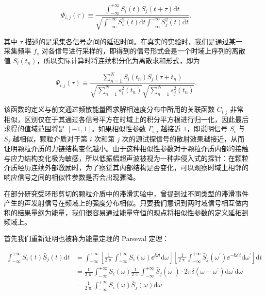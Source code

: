 \begin{equation}
  \Psi_{i,j}(\tau) \equiv \frac{\int_{-\infty}^{+\infty}S_{i}(t)S_{j}(t+\tau)\mathrm{d}t}{\sqrt{\int_{-\infty}^{+\infty}S_{i}^{2}(t)\mathrm{d}t\int_{-\infty}^{+\infty}S_{j}^{2}(t)\mathrm{d}t}}.
\end{equation}

其中 $\tau$ 描述的是采集各信号之间的延迟时间。在真实的实验时，我们是通过某一采集频率 $f_{s}$ 对各信号进行采样的，即得到的信号形式会是一个时域上序列的离散值 $S_{i}(t_{n})$，所以实际计算时将连续积分化为离散求和形式，即为

\begin{equation}
  \Psi_{i,j}(\tau)\equiv \frac{\sum_{n=1}^{N}S_{i}(t_{n})S_{j}(\tau+t_{n})}{\sqrt{\sum_{n=1}^{N}s_{i}^{2}(t_{n})}\sqrt{\sum_{n=1}^{N}s_{j}^{2}(t_{n})}}.
\end{equation}

该函数的定义与前文通过频散能量图求解相速度分布中所用的关联函数 $C_{i,j}$ 非常相似，区别仅在于其通过各信号平方在时域上的积分平方根进行归一化，因此最后求得的值域范围将是 $[-1,1]$。如果相似性参数 $\Gamma_{i,j}$ 越接近 $1$，即说明信号 $S_{i}$ 与 $S_{j}$ 越相似，颗粒介质对于第 $i$ 次和第 $j$ 次的源试探信号的散射效果越接近，从而证明颗粒介质的力链结构变化越小。由于这种相似性参数对于颗粒介质内部的接触与应力结构变化极为敏感，所以低振幅超声波被视为一种非侵入式的探针：在颗粒介质经历连续外部激励时，为了察觉其内部结构是否变化，可以观察时域上相邻的响应信号之间的相似性参数是否会出现骤降。

在部分研究受环形剪切的颗粒介质中的滞滑实验中，曾提到过不同类型的滞滑事件产生的声发射信号在频域上的强度分布相似\cite{doi:10.1073/pnas.2305134120}。只要我们意识到两时域信号相互做内积的结果量纲为能量，我们很容易通过能量守恒的观点将相似性参数的定义延拓到频域上。

首先我们重新证明也被称为能量定理的 Parseval 定理：

\begin{equation}
  \begin{aligned}
    \int_{-\infty}^{+\infty}S_{i}(t)\bar{S}_{j}(t)\mathrm{d}t &= \int_{-\infty}^{+\infty}\left[\frac{1}{2\uppi}\int_{-\infty}^{+\infty}S_{i}(\omega){\ee}^{\ii \omega t}\mathrm{d}\omega\right]\left[\frac{1}{2\uppi}\int_{-\infty}^{+\infty}\bar{S}_{j}(\omega^{\prime}){\ee}^{-\ii \omega^{\prime}t}\mathrm{d}\omega^{\prime}\right]\mathrm{d}t\\
    &= \frac{1}{2\uppi}\int_{-\infty}^{+\infty}S_{i}(\omega)\frac{1}{2\uppi}\int_{-\infty}^{+\infty}\bar{S}_{j}(\omega^{\prime})\cdot 2\pi\delta(\omega-\omega^{\prime})\mathrm{d}\omega^{\prime}\mathrm{d}\omega\\
    &= \frac{1}{2\uppi}\int_{-\infty}^{+\infty}S_{i}(\omega)\bar{S}_{j}(\omega)\mathrm{d}\omega
  \end{aligned}
\end{equation}

